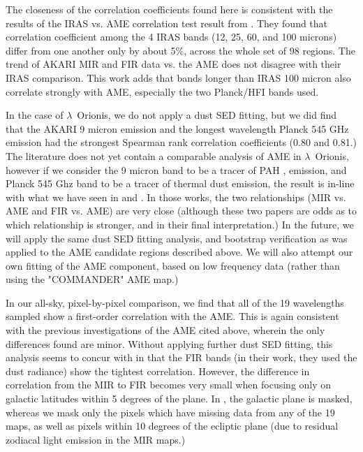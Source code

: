 \documentclass[preprint2,longabstract]{aastex}
\begin{document}
	The closeness of the correlation coefficients found here is consistent with the results of the IRAS vs. AME correlation test result from \cite{planckXV}. They found that correlation coefficient among the 4 IRAS bands (12, 25, 60, and 100 microns) differ from one another only by about 5\%, across the whole set of 98 regions. The trend of AKARI MIR and FIR data vs. the AME does not disagree with their IRAS comparison. This work adds that bands longer than IRAS 100 micron also correlate strongly with AME, especially the two Planck/HFI bands used.
    
    
         In the case of $\lambda$~Orionis, we do not apply a dust SED fitting, but we did find that the AKARI 9 micron emission and the longest wavelength Planck 545 GHz emission had the strongest Spearman rank correlation coefficients (0.80 and 0.81.) The literature does not yet contain a comparable analysis of AME in $\lambda$~Orionis, however if we consider the 9 micron band to be a tracer of PAH , emission, and Planck 545 Ghz band to be a tracer of thermal dust emission, the result is in-line with what we have seen in \cite{ysard10b} and \cite{hensley16}. In those works, the two relationships (MIR vs. AME and FIR vs. AME) are very close (although these two papers are odds as to which relationship is stronger, and in their final interpretation.) In the future, we will apply the same dust SED fitting analysis, and bootstrap verification as was applied to the AME candidate regions described above. We will also attempt our own fitting of the AME component, based on low frequency data (rather than using the "COMMANDER" AME map.)
         
       In our all-sky, pixel-by-pixel comparison, we find that all of the 19 wavelengths sampled show a first-order correlation with the AME. This is again consistent with the previous investigations of the AME cited above, wherein the only differences found are minor. Without applying further dust SED fitting, this analysis seems to concur with \cite{hensley16} in that the FIR bands (in their work, they used the dust radiance) show the tightest correlation. However, the difference in correlation from the MIR to FIR becomes very small when focusing only on galactic latitudes within 5 degrees of the plane. In \cite{hensley16}, the galactic plane is masked, whereas we mask only the pixels which have missing data from any of the 19 maps, as well as pixels within 10 degrees of the ecliptic plane (due to residual zodiacal light emission in the MIR maps.) 
       
\end{document}
